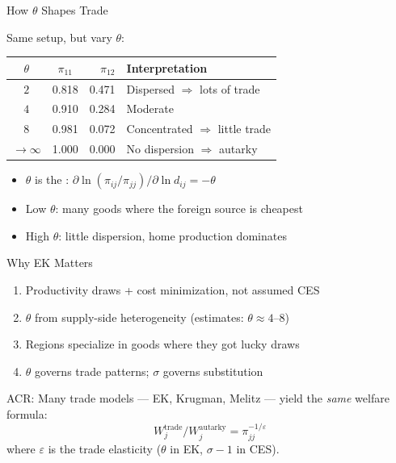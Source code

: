\documentclass{beamer}
\begin{document}
\begin{frame}{How $\theta$ Shapes Trade}

    Same setup, but vary $\theta$:

    \vspace{0.3em}
    {\footnotesize
    \begin{center}
    \begin{tabular}{ccrl}
        \toprule
        $\theta$ & $\pi_{11}$ & $\pi_{12}$ & Interpretation \\
        \midrule
        $2$ & 0.818 & 0.471 & Dispersed $\Rightarrow$ lots of trade \\
        $4$ & 0.910 & 0.284 & Moderate \\
        $8$ & 0.981 & 0.072 & Concentrated $\Rightarrow$ little trade \\
        $\to \infty$ & 1.000 & 0.000 & No dispersion $\Rightarrow$ autarky \\
        \bottomrule
    \end{tabular}
    \end{center}
    }

    \vspace{0.3em}
    \begin{itemize}
        \item $\theta$ is the : $\partial \ln(\pi_{ij}/\pi_{jj})/\partial \ln d_{ij} = -\theta$
        \item Low $\theta$: many goods where the foreign source is cheapest
        \item High $\theta$: little dispersion, home production dominates
    \end{itemize}

\end{frame}

\begin{frame}{Why EK Matters}

    \begin{enumerate}
        \item {} Productivity draws + cost minimization, not assumed CES
        \item {} $\theta$ from supply-side heterogeneity (estimates: $\theta \approx 4$--$8$)
        \item {} Regions specialize in goods where they got lucky draws
        \item {} $\theta$ governs trade patterns; $\sigma$ governs substitution
    \end{enumerate}

    \vspace{0.3em}
    \begin{exampleblock}{ACR: \cite{ArkolakisCostinotRodriguezClare2012_welfare}}
        Many trade models --- EK, Krugman, Melitz --- yield the \emph{same} welfare formula:
        \[ W_j^{\text{trade}}/W_j^{\text{autarky}} = \pi_{jj}^{-1/\varepsilon} \]
        where $\varepsilon$ is the trade elasticity ($\theta$ in EK, $\sigma-1$ in CES).
    \end{exampleblock}

\end{frame}
\end{document}
